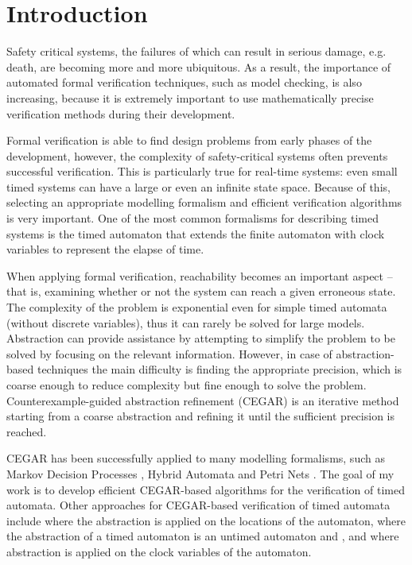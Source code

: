\chapter{Introduction}
\label{chap:introduction}

Safety critical systems, the failures of which can result in serious damage, e.g. death, are becoming more and more ubiquitous. As a result, the importance of automated formal verification techniques, such as model checking, is also increasing, because it is extremely important to use mathematically precise verification methods during their development. 

Formal verification is able to find design problems from early phases of the development, however, the complexity of safety-critical systems often prevents successful verification. This is particularly true for real-time systems: even small timed systems can have a large or even an infinite state space. Because of this, selecting an appropriate modelling formalism and efficient verification algorithms is very important. One of the most common formalisms for describing timed systems is the timed automaton that extends the finite automaton with clock variables to represent the elapse of time.

When applying formal verification, reachability becomes an important aspect – that is, examining whether or not the system can reach a given erroneous state. The complexity of the problem is exponential even for simple timed automata (without discrete variables), thus it can rarely be solved for large models. Abstraction can provide assistance by attempting to simplify the problem to be solved by focusing on the relevant information. However, in case of abstraction-based techniques the main difficulty is finding the appropriate precision, which is coarse enough to reduce complexity but fine enough to solve the problem. Counterexample-guided abstraction refinement (CEGAR) is an iterative method starting from a coarse abstraction and refining it until the sufficient precision is reached.

CEGAR has been successfully applied to many modelling formalisms, such as Markov Decision Processes \cite{kwiatkowska2006game}, Hybrid Automata \cite{journals/fmsd/PrabhakarDM015} and Petri Nets \cite{journals/actaC/HajduVBM14}. The goal of my work is to develop efficient CEGAR-based algorithms for the verification of timed automata. Other approaches for CEGAR-based verification of timed automata include \cite{kemper2007sat} where the abstraction is applied on the locations of the automaton, \cite{nagaoka2010abstraction} where the abstraction of a timed automaton is an untimed
automaton and \cite{dierks2007automatic, he2010compositional}, and \cite{okano2011clock} where abstraction is applied on the clock variables of the automaton.

